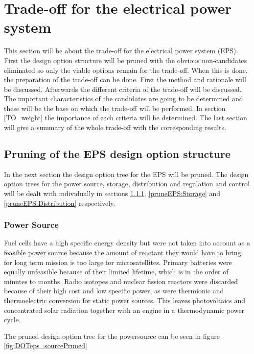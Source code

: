 \section{Trade-off for the electrical power system}
\label{TO_EPS}
This section will be about the trade-off for the electrical power system (EPS). First the design option structure will be pruned
with the obvious non-candidates eliminated so only the viable options remain for the trade-off.
When this is done, the preparation of the trade-off can be done. First the method and rationale will be discussed.
Afterwards the different criteria of the trade-off will be discussed. The important characteristics of the candidates are going to be
determined and these will be the base on which the trade-off will be performed. In section \ref{TO_weight} the importance of each criteria
will be determined. The last section will give a summary of the whole trade-off with the corresponding results.

\subsection{Pruning of the EPS design option structure}
\label{pruneEPS}
In the next section the design option tree for the \ac{EPS} will be pruned. The design option trees for the power source, storage, distribution and regulation and control will be dealt with individually in sections \ref{pruneEPS:Source}, \ref{pruneEPS:Storage} and \ref{pruneEPS:Distribution} respectively.

\subsubsection{Power Source}
\label{pruneEPS:Source}
Fuel cells have a high specific energy density but were not taken into account as a feasible power source because the amount of reactant they would have to bring for long term mission is too large for microsatellites. Primary batteries were equally unfeasible because of their limited lifetime, which is in the order of minutes to months. Radio isotopes and nuclear fission reactors were discarded because of their high cost and low specific power, as were thermionic and thermoelectric conversion for static power sources.
This leaves photovoltaics and concentrated solar radiation together with an engine in a thermodynamic power cycle.

The pruned design option tree for the powersource can be seen in figure \ref{fig:DOTeps_sourcePruned}

